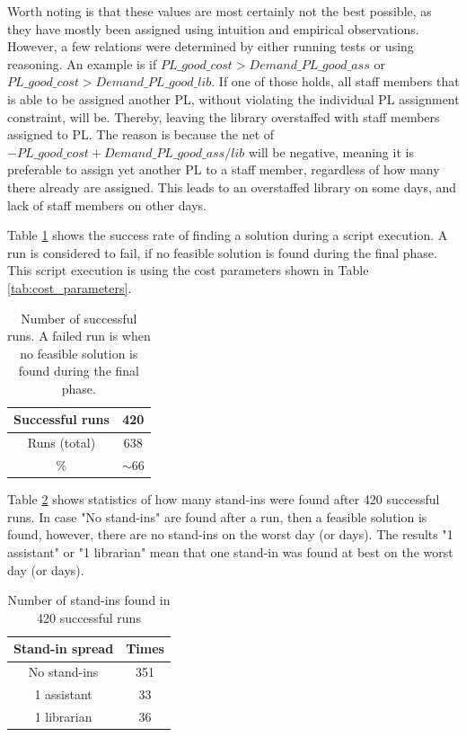 Worth noting is that these values are most certainly not the best possible, as they have mostly been assigned using intuition and empirical observations. However, a few relations were determined by either running tests or using reasoning. An example is if $PL\_good\_cost > Demand\_PL\_good\_ass$ or $PL\_good\_cost > Demand\_PL\_good\_lib$. If one of those holds, all staff members that is able to be assigned another PL, without violating the individual PL assignment constraint, will be. Thereby, leaving the library overstaffed with staff members assigned to PL. The reason is because the net of $-PL\_good\_cost + Demand\_PL\_good\_ass/lib$ will be negative, meaning it is preferable to assign yet another PL to a staff member, regardless of how many there already are assigned. This leads to an overstaffed library on some days, and lack of staff members on other days.

Table \ref{successful_iter} shows the success rate of finding a solution during a script execution. A run is considered to fail, if no feasible solution is found during the final phase. This script execution is using the cost parameters shown in Table \ref{tab:cost_parameters}. 
\begin{table}[!h]
\centering
\caption{Number of successful runs. A failed run is when no feasible solution is found during the final phase.}
\label{successful_iter}
\begin{tabular}{|c|c|}
\hline
Successful runs         & 420      \\ \hline
Runs (total) & 638      \\ \hline
\%                 & $\sim$66 \\ \hline
\end{tabular}
\end{table}

Table \ref{tab:stand_in_spread} shows statistics of how many stand-ins were found after 420 successful runs. In case "No stand-ins" are found after a run, then a feasible solution is found, however, there are no stand-ins on the worst day (or days). The results "1 assistant" or "1 librarian" mean that one stand-in was found at best on the worst day (or days).
\begin{table}[!h]
\centering
\caption{Number of stand-ins found in 420 successful runs}
\label{tab:stand_in_spread}
\begin{tabular}{|c|c|}
\hline
\rowcolor[HTML]{D2D2D2} 
Stand-in spread & Times \\ \hline
No stand-ins    & 351                      \\ \hline
1 assistant     & 33                      \\ \hline
1 librarian 	& 36 \\ \hline
\end{tabular}
\end{table}

